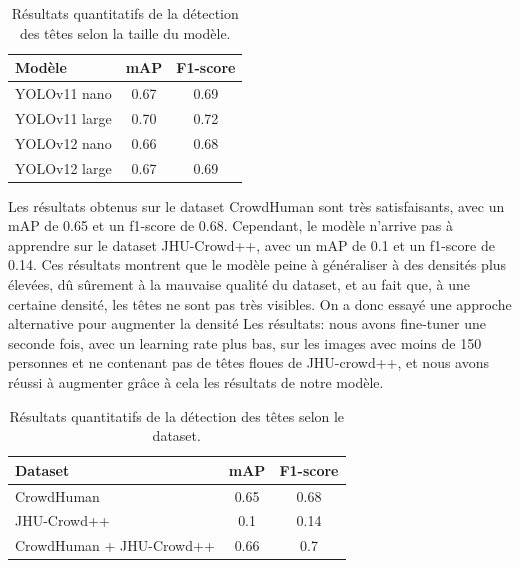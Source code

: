\begin{table}[h]
    \centering
    \scriptsize
    \begin{tabularx}{\linewidth}{>{\raggedright\arraybackslash}Xcc}
        \toprule
        \textbf{Modèle} & \textbf{mAP} & \textbf{F1-score} \\
        \midrule
        YOLOv11 nano & 0.67 & 0.69 \\
        YOLOv11 large & 0.70 & 0.72 \\
        YOLOv12 nano & 0.66 & 0.68 \\
        YOLOv12 large & 0.67 & 0.69 \\
        \bottomrule
    \end{tabularx}
    \caption{Résultats quantitatifs de la détection des têtes selon la taille du modèle.}
    \label{tab:heads-detection-taille}
\end{table}

Les résultats obtenus sur le dataset CrowdHuman sont très satisfaisants, avec un mAP de 0.65 et un f1-score de 0.68. Cependant, le modèle n'arrive pas à apprendre sur le dataset JHU-Crowd++, avec un mAP de 0.1 et un f1-score de 0.14. Ces résultats montrent que le modèle peine à généraliser à des densités plus élevées, dû sûrement à la mauvaise qualité du dataset, et au fait que, à une certaine densité, les têtes ne sont pas très visibles. On a donc essayé une approche alternative pour augmenter la densité Les résultats: nous avons fine-tuner une seconde fois, avec un learning rate plus bas, sur les images avec moins de 150 personnes et ne contenant pas de têtes floues de JHU-crowd++, et nous avons réussi à augmenter grâce à cela les résultats de notre modèle.

\begin{table}[h]
    \centering
    \scriptsize
    \begin{tabularx}{\linewidth}{>{\raggedright\arraybackslash}Xcc}
        \toprule
        \textbf{Dataset} & \textbf{mAP} & \textbf{F1-score} \\
        \midrule
        CrowdHuman & 0.65 & 0.68 \\
        JHU-Crowd++ & 0.1 & 0.14 \\
        CrowdHuman + JHU-Crowd++ & 0.66 & 0.7 \\
        \bottomrule
    \end{tabularx}
    \caption{Résultats quantitatifs de la détection des têtes selon le dataset.}
    \label{tab:heads-detection}
\end{table}

